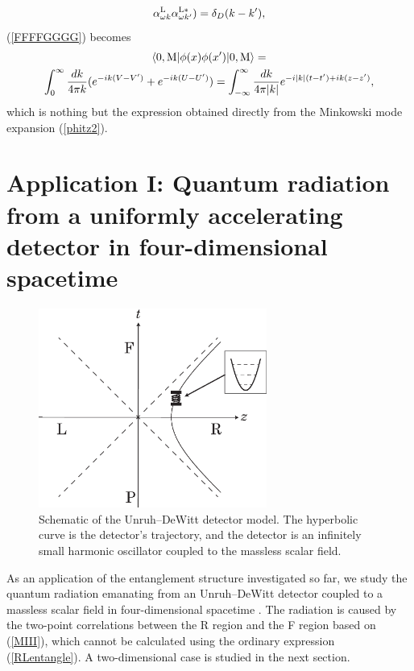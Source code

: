 \documentclass[aps,prd,preprintnumbers,nofootinbib,showpacs,11pt]{revtex4}%
\begin{document}
\begin{widetext}
\begin{equation*}
  \alpha_{\omega k}^{\rm L}\alpha_{\omega k'}^{\rm L*} )=\delta_D(k-k'), 
\end{equation*}
(\ref{FFFFGGGG}) becomes 
\begin{multline}
  \langle0,{\rm M}|\phi(x)\phi(x')|0,{\rm M}\rangle
  =\\
  \int_0^\infty {dk\over 4\pi k}(e^{-ik(V-V')}+e^{-ik(U-U')})=
  \int_{-\infty}^\infty {dk\over 4\pi |k|}e^{-i|k|(t-t')+ik(z-z')} ,
\end{multline}
which is nothing but the expression obtained directly from the Minkowski mode expansion (\ref{phitz2}).



\section{Application I: Quantum radiation from a uniformly accelerating detector in four-dimensional spacetime
\label{Sec:Application1}}
\begin{figure}[t]
\begin{center}
    \includegraphics[width=7.5cm]{fig5.eps}
\caption{Schematic of the Unruh--DeWitt detector model. 
The hyperbolic curve is the detector's trajectory, 
and the detector is an infinitely small harmonic oscillator coupled to the massless scalar field.
\label{fig:conceptualmodel} }
\end{center}
\end{figure}

As an application of the entanglement structure investigated so far, we study the
quantum radiation emanating from 
an Unruh--DeWitt detector coupled to a massless scalar field in four-dimensional spacetime \cite{LH,LH2,IYZ,IYZ2013,IOTYZ,ITUY}. 
The radiation is caused by the two-point correlations between the R region and
the F region based on (\ref{MIII}), which cannot be calculated
using the ordinary expression (\ref{RLentangle}). 
A two-dimensional case is studied in the next section. 


\end{widetext}
\end{document}
